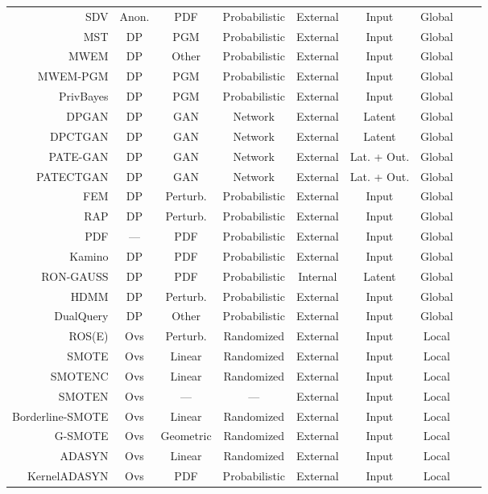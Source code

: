 \begin{longtable}{rcccccccc}
    \bottomrule
    \endlastfoot
    SDV & Anon. & PDF & Probabilistic & External & Input & Global \\
    MST & DP & PGM & Probabilistic & External & Input & Global \\
    MWEM & DP & Other & Probabilistic & External & Input & Global \\
    MWEM-PGM & DP & PGM & Probabilistic & External & Input & Global \\
    PrivBayes & DP & PGM & Probabilistic & External & Input & Global \\
    DPGAN & DP & GAN & Network & External & Latent & Global \\
    DPCTGAN & DP & GAN &  Network & External & Latent & Global \\
    PATE-GAN & DP & GAN & Network & External & Lat. + Out. & Global \\
    PATECTGAN & DP & GAN & Network & External & Lat. + Out. & Global \\
    FEM & DP & Perturb. & Probabilistic & External & Input & Global \\
    RAP & DP & Perturb. & Probabilistic & External & Input & Global \\
    PDF & --- & PDF & Probabilistic & External & Input & Global \\
    Kamino & DP & PDF & Probabilistic & External & Input & Global \\
    RON-GAUSS & DP & PDF & Probabilistic & Internal & Latent & Global \\
    HDMM & DP & Perturb. & Probabilistic & External & Input & Global \\
    DualQuery & DP & Other & Probabilistic & External & Input & Global \\
    ROS(E) & Ovs & Perturb. & Randomized & External & Input & Local \\ 
    SMOTE & Ovs & Linear & Randomized & External & Input & Local \\
    SMOTENC & Ovs & Linear & Randomized & External & Input & Local \\
    SMOTEN & Ovs & --- & --- & External & Input & Local \\
    Borderline-SMOTE & Ovs & Linear & Randomized & External & Input & Local \\
    G-SMOTE & Ovs & Geometric & Randomized & External & Input & Local \\
    ADASYN & Ovs & Linear & Randomized & External & Input & Local \\
    KernelADASYN & Ovs & PDF & Probabilistic & External & Input & Local \\

\end{longtable}
